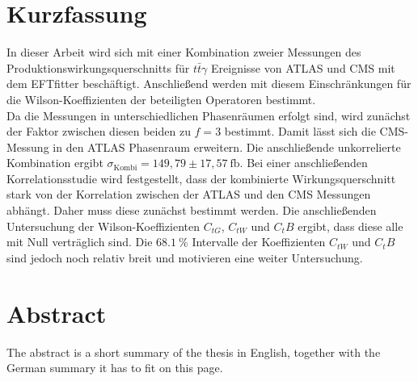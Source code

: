 \thispagestyle{plain}
\section*{Kurzfassung}
In dieser Arbeit wird sich mit einer Kombination zweier Messungen des Produktionswirkungsquerschnitts für $t\bar{t}\gamma$ Ereignisse von ATLAS\cite{Aaboud:2017era} und CMS\cite{Sirunyan:2017iyh} mit dem EFTfitter\cite{Castro:2016jjv} beschäftigt. Anschließend werden mit diesem Einschränkungen für die Wilson-Koeffizienten der beteiligten Operatoren bestimmt.\\
Da die Messungen in unterschiedlichen Phasenräumen erfolgt sind, wird zunächst der Faktor zwischen diesen beiden zu $f=3$ bestimmt. Damit lässt sich die CMS-Messung in den ATLAS Phasenraum erweitern. Die anschließende unkorrelierte Kombination ergibt $\sigma_{\text{Kombi}} = 149,79 \pm 17,57~ \si{\femto\barn}$. Bei einer anschließenden Korrelationsstudie wird festgestellt, dass der kombinierte Wirkungsquerschnitt stark von der Korrelation zwischen der ATLAS und den CMS Messungen abhängt. Daher muss diese zunächst bestimmt werden. Die anschließenden Untersuchung der Wilson-Koeffizienten $C_{tG}$, $C_{tW}$ und $C_tB$ ergibt, dass diese alle mit Null verträglich sind. Die $\SI{68.1}{\percent}$ Intervalle der Koeffizienten $C_{tW}$ und $C_tB$ sind jedoch noch relativ breit und motivieren eine weiter Untersuchung.

\section*{Abstract}
\begin{english}
The abstract is a short summary of the thesis in English, together with the German summary it has to fit on this page.
\end{english}
